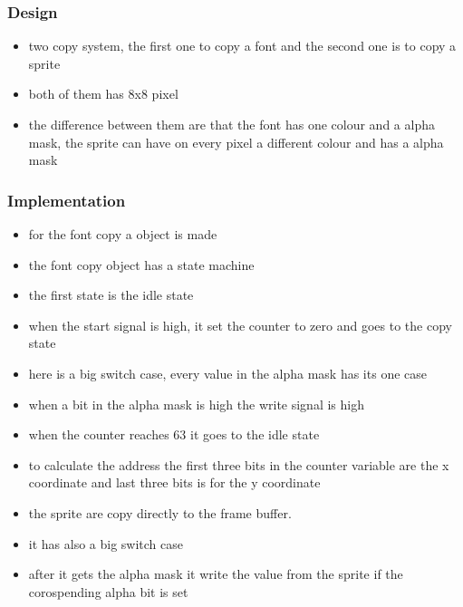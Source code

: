 \subsubsection*{Design}
\begin{itemize}
	\item two copy system, the first one to copy a font and the second one is to copy a sprite
	\item both of them has 8x8 pixel
	\item the difference between them are that the font has one colour and a alpha mask, the sprite can have on every pixel a different colour and has a alpha mask
	
\end{itemize}
\subsubsection*{Implementation}
\begin{itemize}
	\item for the font copy a object is made
	\item the font copy object has a state machine
	\item the first state is the idle state
	\item when the start signal is high, it set the counter to zero and goes to the copy state
	\item here is a big switch case, every value in the alpha mask has its one case
	\item when a bit in the alpha mask is high the write signal is high
	\item when the counter reaches 63 it goes to the idle state
	\item to calculate the address the first three bits in the counter variable are the x coordinate and last three bits is for the y coordinate
	\item the sprite are copy directly to the frame buffer.
	\item it has also a big switch case
	\item after it gets the alpha mask it write the value from the sprite if the corospending alpha bit is set  
\end{itemize}